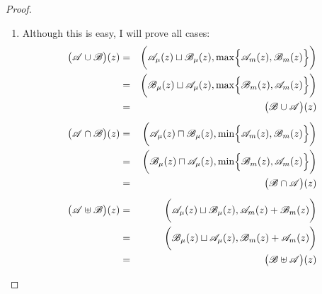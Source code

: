 \documentclass{amsart}
\theoremstyle{definition}
\begin{document}
\begin{proof}
\begin{enumerate}
\item Although this is easy, I will prove all cases:
\begin{eqnarray*}
\bigl(\mathscr{A}\cup\mathscr{B}\bigr)(z)&=&\biggl(
  \mathscr{A}_{\mu}(z)\sqcup\mathscr{B}_{\mu}(z),
  \max\Bigl\{\mathscr{A}_{m}(z),
             \mathscr{B}_{m}(z)\Bigr\}\biggr)\\
&=&
                       \biggl(
  \mathscr{B}_{\mu}(z)\sqcup
             \mathscr{A}_{\mu}(z),
  \max\Bigl\{\mathscr{B}_{m}(z),
             \mathscr{A}_{m}(z)\Bigr\}\biggr)\\
&=& \bigl(\mathscr{B}\cup\mathscr{A}\bigr)(z)\\[5pt]
\bigl(\mathscr{A}\cap\mathscr{B}\bigr)(z)&=&\biggl(
  \mathscr{A}_{\mu}(z)\sqcap\mathscr{B}_{\mu}(z),
  \min\Bigl\{\mathscr{A}_{m}(z),
             \mathscr{B}_{m}(z)\Bigr\}\biggr)\\
&=&
                       \biggl(
  \mathscr{B}_{\mu}(z)\sqcap\mathscr{A}_{\mu}(z),
  \min\Bigl\{\mathscr{B}_{m}(z),
             \mathscr{A}_{m}(z)\Bigr\}\biggr)\\
   &=& \bigl(\mathscr{B}\cap\mathscr{A}\bigr)(z)\\[5pt]
\bigl(\mathscr{A}\uplus\mathscr{B}\bigr)(z)&=&\biggl(
  \mathscr{A}_{\mu}(z)\sqcup\mathscr{B}_{\mu}(z),
  \mathscr{A}_{m}(z)+\mathscr{B}_{m}(z)\biggr)\\
&=&
                       \biggl(
   \mathscr{B}_{\mu}(z)\sqcup\mathscr{A}_{\mu}(z),
   \mathscr{B}_{m}(z)+ \mathscr{A}_{m}(z)\biggr)\\
   &=& \bigl(\mathscr{B}\uplus\mathscr{A}\bigr)(z)
\end{eqnarray*}


\end{enumerate}
\end{proof}
\end{document}

